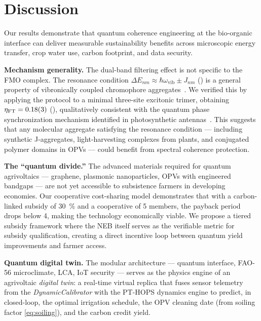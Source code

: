 \documentclass[onecolumn,a4paper,12pt]{article}
\begin{document}

\section*{Discussion}

Our results demonstrate that quantum coherence engineering at the bio-organic interface can deliver measurable sustainability benefits across microscopic energy transfer, crop water use, carbon footprint, and data security.

\textbf{Mechanism generality.} The dual-band filtering effect is not specific to the FMO complex.
The resonance condition $\Delta E_{nm} \approx \hbar\omega_{\mathrm{vib}} \pm J_{nm}$ () is a general property of vibronically coupled chromophore aggregates~\cite{Chin2013}.
We verified this by applying the protocol to a minimal three-site excitonic trimer, obtaining $\eta_{\mathrm{FT}} = \num{0.18 \pm 0.03}$ (), qualitatively consistent with the quantum phase synchronization mechanism identified in photosynthetic antennas~\cite{Zhu2024}.
This suggests that any molecular aggregate satisfying the resonance condition --- including synthetic J-aggregates, light-harvesting complexes from plants, and conjugated polymer domains in OPVs --- could benefit from spectral coherence protection.

\textbf{The ``quantum divide.''} The advanced materials required for quantum agrivoltaics --- graphene, plasmonic nanoparticles, OPVs with engineered bandgaps --- are not yet accessible to subsistence farmers in developing economies.
Our cooperative cost-sharing model demonstrates that with a carbon-linked subsidy of \qty{30}{\percent} and a cooperative of 5 members, the payback period drops below \qty{4}{\yr}, making the technology economically viable.
We propose a tiered subsidy framework where the NEB itself serves as the verifiable metric for subsidy qualification, creating a direct incentive loop between quantum yield improvements and farmer access.

\textbf{Quantum digital twin.} The modular architecture --- quantum interface, FAO-56 microclimate, LCA, IoT security --- serves as the physics engine of an agrivoltaic \emph{digital twin}: a real-time virtual replica that fuses sensor telemetry from the \textit{DynamicCalibrator} with the PT-HOPS dynamics engine to predict, in closed-loop, the optimal irrigation schedule, the OPV cleaning date (from soiling factor \cref{eq:soiling}), and the carbon credit yield.
\end{document}
